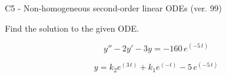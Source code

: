\begin{exercise}
  \begin{exerciseTitle}C5 - Non-homogeneous second-order linear ODEs (ver. 99)\end{exerciseTitle}
  \begin{exerciseStatement}
    
Find the solution to the given ODE.

    
\[y''-2y'-3y = -160 \, e^{\left(-5 \, t\right)}\]

  \end{exerciseStatement}
  \begin{exerciseAnswer}
    
\[y= k_{2} e^{\left(3 \, t\right)} + k_{1} e^{\left(-t\right)} - 5 \, e^{\left(-5 \, t\right)}\]

  \end{exerciseAnswer}
\end{exercise}